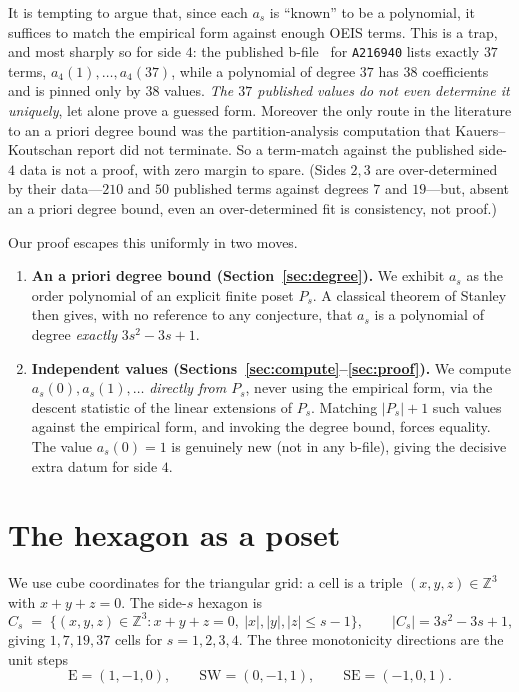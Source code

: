 \documentclass[11pt]{article}
\theoremstyle{plain}
\theoremstyle{definition}
\theoremstyle{remark}
\newcommand{\OEIS}[1]{\texttt{#1}}
\newcommand{\Eseq}{\mathrm{E}}
\newcommand{\SW}{\mathrm{SW}}
\newcommand{\SE}{\mathrm{SE}}
\begin{document}
It is tempting to argue that, since each $a_s$ is ``known'' to be a polynomial, it suffices to match
the empirical form against enough OEIS terms. This is a trap, and most sharply so for side $4$: the
published b-file~\cite{OEIS} for \OEIS{A216940} lists exactly $37$ terms, $a_4(1),\dots,a_4(37)$,
while a polynomial of degree $37$ has $38$ coefficients and is pinned only by $38$ values. \emph{The
$37$ published values do not even determine it uniquely}, let alone prove a guessed form. Moreover
the only route in the literature to an a priori degree bound was the partition-analysis computation
that Kauers--Koutschan report did not terminate. So a term-match against the published side-$4$ data
is not a proof, with zero margin to spare. (Sides $2,3$ are over-determined by their data---$210$ and
$50$ published terms against degrees $7$ and $19$---but, absent an a priori degree bound, even an
over-determined fit is consistency, not proof.)

Our proof escapes this uniformly in two moves.
\begin{enumerate}[leftmargin=1.4em]
  \item \textbf{An a priori degree bound (Section~\ref{sec:degree}).} We exhibit $a_s$ as the order
  polynomial of an explicit finite poset $P_s$. A classical theorem of Stanley then gives, with no
  reference to any conjecture, that $a_s$ is a polynomial of degree \emph{exactly} $3s^2-3s+1$.
  \item \textbf{Independent values (Sections~\ref{sec:compute}--\ref{sec:proof}).} We compute
  $a_s(0),a_s(1),\dots$ \emph{directly from $P_s$}, never using the empirical form, via the descent
  statistic of the linear extensions of $P_s$. Matching $\lvert P_s\rvert+1$ such values against the
  empirical form, and invoking the degree bound, forces equality. The value $a_s(0)=1$ is genuinely
  new (not in any b-file), giving the decisive extra datum for side $4$.
\end{enumerate}

\section{The hexagon as a poset}\label{sec:poset}

We use cube coordinates for the triangular grid: a cell is a triple $(x,y,z)\in\mathbb Z^3$ with
$x+y+z=0$. The side-$s$ hexagon is
\[
  C_s \;=\;\{(x,y,z)\in\mathbb Z^3 : x+y+z=0,\ |x|,|y|,|z|\le s-1\},
  \qquad |C_s|=3s^2-3s+1,
\]
giving $1,7,19,37$ cells for $s=1,2,3,4$. The three monotonicity directions are the unit steps
\[
  \Eseq=(1,-1,0),\qquad \SW=(0,-1,1),\qquad \SE=(-1,0,1).
\]
\end{document}
